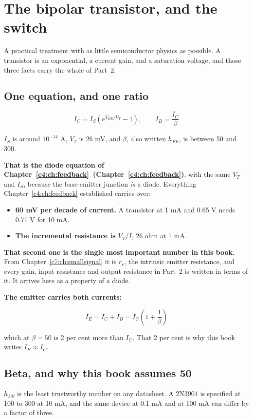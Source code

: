 
\section{The bipolar transistor, and the switch}
\label{c5:app:a}

A practical treatment with as little semiconductor physics as possible. A transistor is an exponential, a current gain, and a saturation voltage, and those three facts carry the whole of Part~2.

\subsection{One equation, and one ratio}
\label{c5:sec:a1}
\[
  I_C = I_S\left(e^{V_{BE}/V_T} - 1\right), \qquad I_B = \frac{I_C}{\beta}
\]

$I_S$ is around $10^{-14}$ A, $V_T$ is 26 mV, and $\beta$, also written $h_{FE}$, is between 50 and 300.

\textbf{That is the diode equation of Chapter~\ref{c4:ch:feedback}~(Chapter~\ref{c4:ch:feedback})}, with the same $V_T$ and $I_S$, because the base-emitter junction \emph{is} a diode. Everything Chapter~\ref{c4:ch:feedback} established carries over:

\begin{itemize}
  \item \textbf{60 mV per decade of current.} A transistor at 1 mA and 0.65 V needs 0.71 V for 10 mA.
  \item \textbf{The incremental resistance is $V_T/I$}, 26 ohm at 1 mA.
\end{itemize}
\textbf{That second one is the single most important number in this book.} From Chapter~\ref{c7:ch:smallsignal} it is $r_e$, the intrinsic emitter resistance, and every gain, input resistance and output resistance in Part~2 is written in terms of it. It arrives here as a property of a diode.

\textbf{The emitter carries both currents:}

\[
  I_E = I_C + I_B = I_C\left(1 + \frac{1}{\beta}\right)
\]

which at $\beta = 50$ is 2 per cent more than $I_C$. That 2 per cent is why this book writes $I_E \approx I_C$.

\subsection{Beta, and why this book assumes 50}
\label{c5:sec:a2}
$h_{FE}$ is the least trustworthy number on any datasheet. A 2N3904 is specified at 100 to 300 at 10 mA, and the same device at 0.1 mA and at 100 mA can differ by a factor of three.

